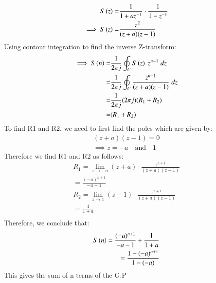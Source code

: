 \documentclass[journal,12pt,twocolumn]{IEEEtran}
\theoremstyle{remark}
\begin{document}
\begin{align}
    S\left(z\right) = &\frac{1}{1+az^{-1}}\cdot\frac{1}{1-z^{-1}}\\
    \implies S\left(z\right) = &\frac{z^{2}}{(z+a)(z-1)}
\end{align}
Using contour integration to find the inverse Z-transform:\\
\begin{align}
    \implies S\left(n\right)=&\dfrac{1}{2\pi j}\oint_{C}S\left(z\right) \;z^{n-1} \;dz\\
    =&\dfrac{1}{2\pi j}\oint_{C}\frac{z^{n+1}}{(z+a)(z-1)} \;dz \\
    =&\dfrac{1}{2\pi j}(2\pi j)(R_{\text{1}} + R_{\text{2}})\\
    =&(R_{\text{1}} + R_{\text{2}})\\
\end{align}
To find R1 and R2, we need to first find the poles which are given by:
\begin{align}
    (z+a)(z-1) =0\\
    \implies z=-a \quad \text{and} \quad 1
\end{align}
Therefore we find R1 and R2 as follows:
\begin{align}
    R_{\text{1}} = \lim_{{z \to -a }} (z+a)\cdot \frac{z^{n+1}}{(z+a)(z-1)}\\
    = \frac{(-a)^{n+1}}{-a-1} \\
    R_{\text{2}} = \lim_{{z \to 1}} (z-1)\cdot \frac{z^{n+1}}{(z+a)(z-1)}\\
    = \frac{1}{1+a}\\
\end{align}
Therefore, we conclude that:
\begin{align}
    S\left(n\right) = \frac{(-a)^{n+1}}{-a-1} + \frac{1}{1+a}\\
    = \frac{1-(-a)^{n+1}}{1-(-a)}\\
\end{align}
This gives the sum of n terms of the G.P
\end{document}
